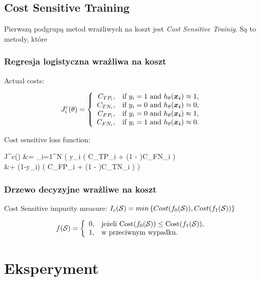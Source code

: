 \documentclass{book}
\begin{document}
	\section{Cost Sensitive Training}
	
		Pierwszą podgrupą metod wrażliwych na koszt jest \textit{Cost Sensitive Trainig}. Są to metody, które 
	
	\subsection{Regresja logistyczna wrażliwa na koszt}
	
	    Actual costs:
	
		$$
		J^c_i(\theta)=\left\{
		\begin{array}{rl}
		C_{TP_i}, &\mbox{if $y_i = 1$ and $h_{\theta}(\boldsymbol{x_i}) \approx 1$}, \\
		C_{TN_i}, &\mbox{if $y_i = 0$ and $h_{\theta}(\boldsymbol{x_i}) \approx 0$}, \\
		C_{FP_i}, &\mbox{if $y_i = 0$ and $h_{\theta}(\boldsymbol{x_i}) \approx 1$}, \\
		C_{FN_i}, &\mbox{if $y_i = 1$ and $h_{\theta}(\boldsymbol{x_i}) \approx 0$}.
		\end{array}
		\right.
		$$
		
		Cost sensitive loss function:
		\begin{talign*}
			J^c(\theta) &=  \sum_{i=1}^{N} \bigg( y_i \Big( \htx C_{TP_i} + (1 - \htx)C_{FN_i} \Big) \\
			&+ (1-y_i) \Big( \htx C_{FP_i} + (1 - \htx)C_{TN_i} \Big) \bigg)
		\end{talign*}
	
	\subsection{Drzewo decyzyjne wrażliwe na koszt}
	
	
	
		
		Cost Sensitive impurity measure:
		$ I_c(\mathcal{S}) = min \left\{ Cost(f_0(\mathcal{S})), Cost(f_1(\mathcal{S})) \right\}$
		
		$$ f(\mathcal{S}) =  \left\{
			\begin{array}{rl}
				0, &\mbox{jeżeli $\text{Cost}(f_0(\mathcal{S})) \leq \text{Cost}(f_1(\mathcal{S}))$}, \\
				1, &\mbox{w przeciwnym wypadku}.
			\end{array}{}
		\right.
		$$
	
	

\chapter{Eksperyment}
\end{document}
